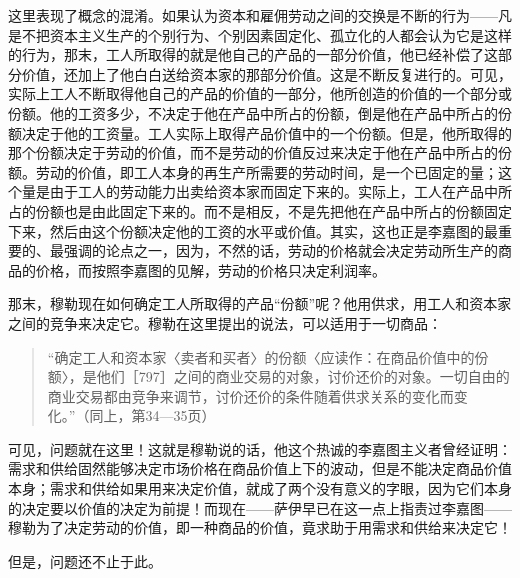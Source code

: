 这里表现了概念的混淆。如果认为资本和雇佣劳动之间的交换是不断的行为——凡是不把资本主义生产的个别行为、个别因素固定化、孤立化的人都会认为它是这样的行为，那末，工人所取得的就是他自己的产品的一部分价值，他已经补偿了这部分价值，还加上了他白白送给资本家的那部分价值。这是不断反复进行的。可见，实际上工人不断取得他自己的产品的价值的一部分，他所创造的价值的一个部分或份额。他的工资多少，不决定于他在产品中所占的份额，倒是他在产品中所占的份额决定于他的工资量。工人实际上取得产品价值中的一个份额。但是，他所取得的那个份额决定于劳动的价值，而不是劳动的价值反过来决定于他在产品中所占的份额。劳动的价值，即工人本身的再生产所需要的劳动时间，是一个已固定的量；这个量是由于工人的劳动能力出卖给资本家而固定下来的。实际上，工人在产品中所占的份额也是由此固定下来的。而不是相反，不是先把他在产品中所占的份额固定下来，然后由这个份额决定他的工资的水平或价值。其实，这也正是李嘉图的最重要的、最强调的论点之一，因为，不然的话，劳动的价格就会决定劳动所生产的商品的价格，而按照李嘉图的见解，劳动的价格只决定利润率。

那末，穆勒现在如何确定工人所取得的产品“份额”呢？他用供求，用工人和资本家之间的竞争来决定它。穆勒在这里提出的说法，可以适用于一切商品：

\begin{quote}{“确定工人和资本家〈卖者和买者〉的份额〈应读作：在商品价值中的份额〉，是他们［797］之间的商业交易的对象，讨价还价的对象。一切自由的商业交易都由竞争来调节，讨价还价的条件随着供求关系的变化而变化。”（同上，第34—35页）}\end{quote}

可见，问题就在这里！这就是穆勒说的话，他这个热诚的李嘉图主义者曾经证明：需求和供给固然能够决定市场价格在商品价值上下的波动，但是不能决定商品价值本身；需求和供给如果用来决定价值，就成了两个没有意义的字眼，因为它们本身的决定要以价值的决定为前提！而现在——萨伊早已在这一点上指责过李嘉图——穆勒为了决定劳动的价值，即一种商品的价值，竟求助于用需求和供给来决定它！

但是，问题还不止于此。


